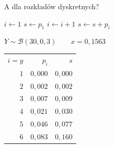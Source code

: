 \documentclass{mp}
\begin{document}
\begin{frame}{A dla rozkładów dyskretnych?}
\begin{minipage}{.49\textwidth}
\begin{algorithm}[H]
$i\leftarrow 1$\;
$s\leftarrow p_1$ \;
{
$i \leftarrow i+1$\;
$s \leftarrow s+p_i$\;
}
\end{algorithm}
\end{minipage}
\pause
\begin{minipage}{.49\textwidth}
$Y\sim \mathcal{B}(30,0{,}3) \qquad x=0{,}1563$ \\
\pause
\begin{tabular}{rrr}
$i=y$ &	$p_i$	& $s$ \\
$1$ & $0{,}000$ & $0{,}000$ \\
\pause
$2$ & $0{,}002$ & $0{,}002$ \\
$3$ & $0{,}007$ & $0{,}009$ \\
$4$ & $0{,}021$ & $0{,}030$ \\
$5$ & $0{,}046$ & $0{,}077$ \\
$6$ & $0{,}083$ & \alert{$0{,}160$} \\
\end{tabular}
\end{minipage}
\end{frame}
\end{document}
